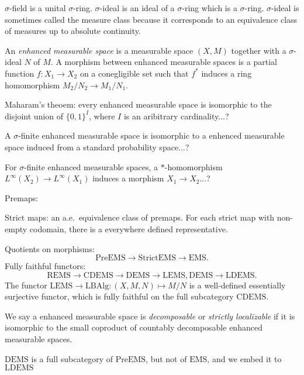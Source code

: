 \documentclass{../../large}
\begin{document}
$\sigma$-field is a unital $\sigma$-ring.
$\sigma$-ideal is an ideal of a $\sigma$-ring which is a $\sigma$-ring.
$\sigma$-ideal is sometimes called the measure class because it corresponds to an equivalence class of measures up to absolute continuity.


\begin{prb}
An \emph{enhanced measurable space} is a measurable space $(X,M)$ together with a $\sigma$-ideal $N$ of $M$.
A morphism between enhanced measurable spaces is a partial function $f:X_1\to X_2$ on a conegligible set such that $f^*$ induces a ring homomorphism $M_2/N_2\to M_1/N_1$.
\begin{parts}
\item Maharam's theoem: every enhanced measurable space is isomorphic to the disjoint union of $\{0,1\}^I$, where $I$ is an aribitrary cardinality...?
\item A $\sigma$-finite enhanced measurable space is isomorphic to a enhenced measurable space induced from a standard probability space...?
\item For $\sigma$-finite enhanced measurable spaces, a $*$-homomorphism $L^\infty(X_2)\to L^\infty(X_1)$ induces a morphism $X_1\to X_2$...?
\end{parts}
\end{prb}


Premaps: 

Strict maps: an a.e.~equivalence class of premaps. For each strict map with non-empty codomain, there is a everywhere defined representative.


Quotients on morphisms:
\[\mathrm{PreEMS}\to\mathrm{StrictEMS}\to\mathrm{EMS}.\]
Fully faithful functors:
\[\mathrm{REMS}\to\mathrm{CDEMS}\to\mathrm{DEMS}\to\mathrm{LEMS}, \mathrm{DEMS}\to\mathrm{LDEMS}.\]
The functor $\mathrm{LEMS}\to\mathrm{LBAlg}:(X,M,N)\mapsto M/N$ is a well-defined essentially surjective functor, which is fully faithful on the full subcategory $\mathrm{CDEMS}$.

We say a enhanced measurable space is \emph{decomposable} or \emph{strictly localizable} if it is isomorphic to the small coproduct of countably decomposable enhanced measurable spaces.

$\mathrm{DEMS}$ is a full subcategory of $\mathrm{PreEMS}$, but not of $\mathrm{EMS}$, and we embed it to $\mathrm{LDEMS}$
\end{document}
